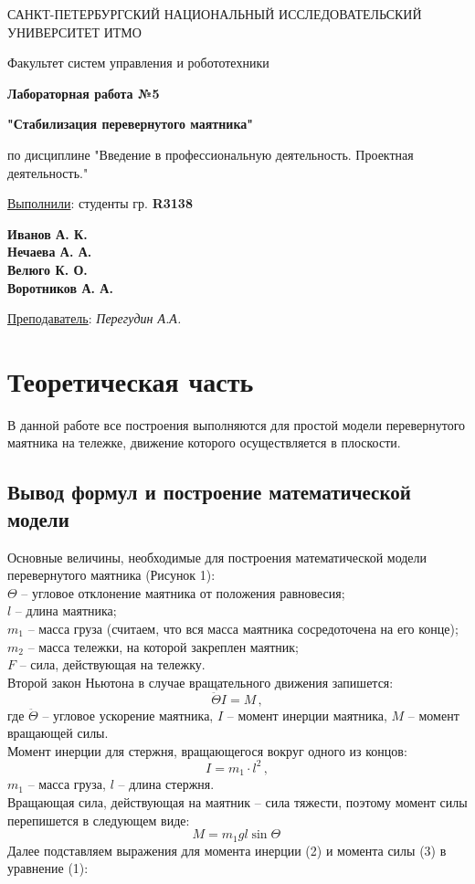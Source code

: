 \documentclass[a5paper, 10pt]{article}
\theoremstyle{definition}
\theoremstyle{plain}
\theoremstyle{remark}
\newcommand*{\titlePage}{
	\thispagestyle{title}
	\begingroup
	\begin{center}
		\vspace*{6ex}
		
		{\small
			САНКТ-ПЕТЕРБУРГСКИЙ НАЦИОНАЛЬНЫЙ ИССЛЕДОВАТЕЛЬСКИЙ УНИВЕРСИТЕТ ИТМО
		}
		
		\vspace*{2ex}
		
		{\normalsize
			Факультет систем управления и робототехники
		}
		
		\vspace*{15ex}
		
		{\Large \bfseries 
			Лабораторная работа  №5
		}

                     \vspace*{2ex}
{\Large \bfseries 
			"Стабилизация перевернутого маятника"
		}

                     \vspace*{2ex}
		
		{\normalsize
			по дисциплине "Введение в профессиональную деятельность. Проектная деятельность."
		}
                     \vspace*{2ex}
	\end{center}
	\vspace*{10ex}
	\begin{flushright}
		{\large 
			\underline{Выполнили}: студенты гр. \textbf{R3138}\\
			\begin{flushright}
				\textbf{Иванов А. К.}\\
                                           \textbf{Нечаева А. А.}\\
                                           \textbf{Велюго К. О.}\\
                                           \textbf{Воротников А. А.}\\
			\end{flushright}
		}
		
		\vspace*{5ex}
		
		{\large 
			\underline{Преподаватель}: \textit{Перегудин А.А.}
		}
	\end{flushright}	
	\newpage
	\setcounter{page}{2}
	\endgroup}
\begin{document}
	\titlePage
	\pagestyle{style}


\newpage
\section{Теоретическая часть}	
В данной работе все построения выполняются для простой модели перевернутого маятника на тележке, движение которого осуществляется в плоскости.

\subsection{Вывод формул и построение математической модели}	
Основные величины, необходимые для построения математической модели перевернутого маятника (Рисунок 1):\\
$\Theta $ -- угловое отклонение маятника от положения равновесия;\\
$l$ -- длина маятника;\\
$m_1$ -- масса груза (считаем, что вся масса маятника сосредоточена на его конце);\\
$m_2$ -- масса тележки, на которой закреплен маятник;\\
$F$ -- сила, действующая на тележку.\\
Второй закон Ньютона в случае вращательного движения запишется:
\begin{equation}
\ddot{\Theta}I = M \, ,
\end{equation}
где $\ddot{\Theta}$ -- угловое ускорение маятника, $I$ -- момент инерции маятника, $M$ -- момент вращающей силы.\\
Момент инерции для стержня, вращающегося вокруг одного из концов:
\begin{equation}
I = m_1 \cdot l^2 \, ,
\end{equation}
$m_1$ -- масса груза, $l$ -- длина стержня.\\
Вращающая сила, действующая на маятник -- сила тяжести, поэтому момент силы перепишется в следующем виде:
\begin{equation}
M = m_1 g l \sin \Theta \, 
\end{equation}
Далее подставляем выражения для момента инерции (2) и момента силы (3) в уравнение (1):
 
\end{document}
